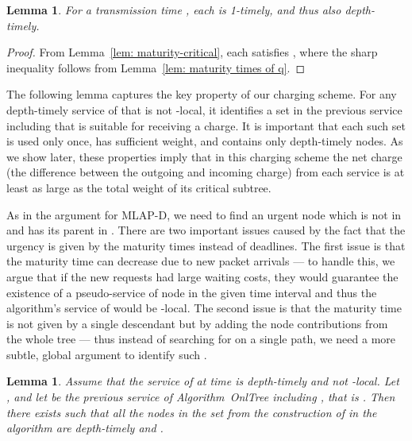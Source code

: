 \documentclass[a4paper]{article}
\newtheorem{lemma}[theorem]{Lemma}
\newcommand{\OnAlgTreesGeneral}{{\sc OnlTree}}
\newcommand{\MLAPD}{\mbox{\rm\textsf{MLAP-D}}}
\begin{document}
\begin{lemma}\label{lem: each v in C is depth-timely}
For a transmission time , each  is 1-timely, and
thus also depth-timely.
\end{lemma}

\begin{proof}
From Lemma~\ref{lem: maturity-critical}, each  satisfies 
,
where the sharp inequality follows from Lemma~\ref{lem: maturity times of q}.
\end{proof}

The following lemma captures the key property of our charging scheme.  For any
depth-timely service of  that is not -local, it identifies
a set  in the previous service  including 
that is suitable for receiving a charge. It is important that each such set is
used only once, has sufficient weight, and contains only depth-timely
nodes.  As we show later, these properties imply that in this charging scheme
the net charge (the difference between the outgoing and incoming charge)
from each service  is at least as large as
the total weight of its critical subtree.

As in the argument for {\MLAPD}, we need to find an urgent node 
 which is not in  and has its parent in . There
are two important issues caused by the fact that the urgency is
given by the maturity times instead of deadlines. The first issue is
that the maturity time can decrease due to new packet arrivals --- to
handle this, we argue that if the new requests had large waiting
costs, they would guarantee the existence of a pseudo-service of node  in the given
time interval and thus the algorithm's service of
 would be -local. The second issue is that the
maturity time is not given by a single descendant but by adding the node
contributions from the whole tree --- thus instead of searching for  on
a single path, we need a more subtle, global argument to identify such .


\begin{lemma}\label{l:charge}
Assume that the service of  at time  is depth-timely and
not -local.  Let , and let  be
the previous service of Algorithm~{\OnAlgTreesGeneral} including , that is
. Then there exists  such that all the nodes in
the set  from the construction of  in the
algorithm are depth-timely and .
\end{lemma}
\end{document}
